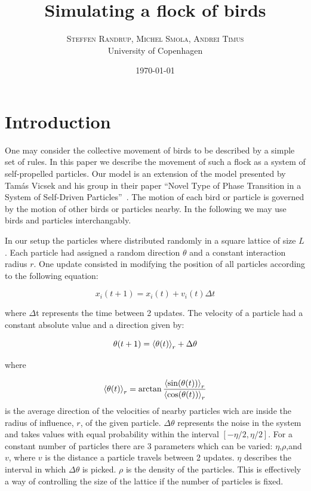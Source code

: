 \documentclass[twoside,twocolumn]{article}
\title{Simulating a flock of birds} %
\author{%
\textsc{Steffen Randrup, Michel Smola, Andrei Timus}\\[1ex] %
\normalsize University of Copenhagen \\ %
}
\date{\today} %
\begin{document}
\maketitle


\section{Introduction}

One may consider the collective movement of birds to be described by a simple set of rules.
In this paper we describe the movement of such a flock as a system of self-propelled particles.
Our model is an extension of the model presented by Tamás Vicsek and his group in their paper ``Novel Type of Phase Transition in a System of Self-Driven Particles''~\cite{Vicsek}.
The motion of each bird or particle is governed by the motion of other birds or particles nearby.
In the following we may use birds and particles interchangably.

In our setup the particles where distributed randomly in a square lattice of size $L$.
Each particle had assigned a random direction $\theta$ and a constant interaction radius $r$.
One update consisted in modifying the position of all particles according to the following equation:

\begin{equation}
x_{i}(t+1)=x_i(t)+v_i(t)\Delta t
\end{equation}

where $\Delta$t represents the time between 2 updates.
The velocity of a particle had a constant absolute value and a direction given by:

\begin{equation}
\theta(t+1)=\braket{\theta(t)}_r+\Delta \theta
\end{equation} 

where 

\begin{equation}
  \braket{\theta(t)}_r=\arctan\frac{\braket{\sin(\theta(t))}_r}{\braket{\cos(\theta(t))}_r}
\end{equation}
%
is the average direction of the velocities of nearby particles wich are inside the radius of influence, $r$, of the given particle.
$\Delta \theta$ represents the noise in the system and takes values with equal probability within the interval $[-\eta/2,\eta/2]$.
For a constant number of particles there are 3 parameters which can be varied: $\eta$,$\rho$,and $v$,
where $v$ is the distance a particle travels between 2 updates.
$\eta$ describes the interval in which $\Delta\theta$ is picked. $\rho$ is the density of the particles.
This is effectively a way of controlling the size of the lattice if the number of particles is fixed.
\end{document}

